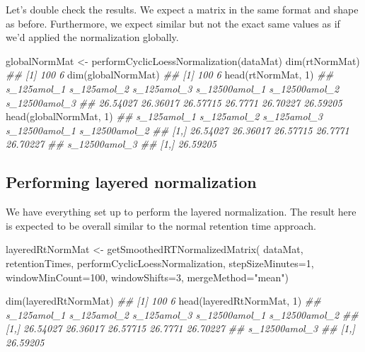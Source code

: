 \documentclass[]{article}
\newcommand{\hlnum}[1]{\textcolor[rgb]{0.816,0.125,0.439}{#1}}%
\newcommand{\hlstr}[1]{\textcolor[rgb]{0.251,0.627,0.251}{#1}}%
\newcommand{\hlcom}[1]{\textcolor[rgb]{0.502,0.502,0.502}{\textit{#1}}}%
\newcommand{\hlstd}[1]{\textcolor[rgb]{0.251,0.251,0.251}{#1}}%
\newenvironment{Shaded}{\begin{myshaded}}{\end{myshaded}}
\newcommand{\DecValTok}[1]{\hlnum{#1}}
\newcommand{\StringTok}[1]{\hlstr{#1}}
\newcommand{\DocumentationTok}[1]{\hlcom{#1}}
\newcommand{\OtherTok}[1]{{#1}}
\newcommand{\FunctionTok}[1]{\hlstd{#1}}
\newcommand{\AttributeTok}[1]{{#1}}
\newcommand{\NormalTok}[1]{\hlstd{#1}}
\begin{document}
Let's double check the results. We expect a matrix in the same format and shape as before. Furthermore, we expect similar but not the exact same values as if we'd applied the normalization globally.

\begin{Shaded}
\begin{Highlighting}[]
\NormalTok{globalNormMat }\OtherTok{\textless{}{-}} \FunctionTok{performCyclicLoessNormalization}\NormalTok{(dataMat)}
\FunctionTok{dim}\NormalTok{(rtNormMat)}
\DocumentationTok{\#\# [1] 100   6}
\FunctionTok{dim}\NormalTok{(globalNormMat)}
\DocumentationTok{\#\# [1] 100   6}
\FunctionTok{head}\NormalTok{(rtNormMat, }\DecValTok{1}\NormalTok{)}
\DocumentationTok{\#\#  s\_125amol\_1 s\_125amol\_2 s\_125amol\_3 s\_12500amol\_1 s\_12500amol\_2 s\_12500amol\_3}
\DocumentationTok{\#\#     26.54027    26.36017    26.57715       26.7771      26.70227      26.59205}
\FunctionTok{head}\NormalTok{(globalNormMat, }\DecValTok{1}\NormalTok{)}
\DocumentationTok{\#\#      s\_125amol\_1 s\_125amol\_2 s\_125amol\_3 s\_12500amol\_1 s\_12500amol\_2}
\DocumentationTok{\#\# [1,]    26.54027    26.36017    26.57715       26.7771      26.70227}
\DocumentationTok{\#\#      s\_12500amol\_3}
\DocumentationTok{\#\# [1,]      26.59205}
\end{Highlighting}
\end{Shaded}

\hypertarget{performing-layered-normalization}{%
\subsection{Performing layered normalization}\label{performing-layered-normalization}}

We have everything set up to perform the layered normalization. The result here is expected to be overall similar to the normal retention time approach.

\begin{Shaded}
\begin{Highlighting}[]
\NormalTok{layeredRtNormMat }\OtherTok{\textless{}{-}} \FunctionTok{getSmoothedRTNormalizedMatrix}\NormalTok{(}
\NormalTok{    dataMat, }
\NormalTok{    retentionTimes, }
\NormalTok{    performCyclicLoessNormalization, }
    \AttributeTok{stepSizeMinutes=}\DecValTok{1}\NormalTok{, }
    \AttributeTok{windowMinCount=}\DecValTok{100}\NormalTok{, }
    \AttributeTok{windowShifts=}\DecValTok{3}\NormalTok{, }
    \AttributeTok{mergeMethod=}\StringTok{"mean"}\NormalTok{)}

\FunctionTok{dim}\NormalTok{(layeredRtNormMat)}
\DocumentationTok{\#\# [1] 100   6}
\FunctionTok{head}\NormalTok{(layeredRtNormMat, }\DecValTok{1}\NormalTok{)}
\DocumentationTok{\#\#      s\_125amol\_1 s\_125amol\_2 s\_125amol\_3 s\_12500amol\_1 s\_12500amol\_2}
\DocumentationTok{\#\# [1,]    26.54027    26.36017    26.57715       26.7771      26.70227}
\DocumentationTok{\#\#      s\_12500amol\_3}
\DocumentationTok{\#\# [1,]      26.59205}
\end{Highlighting}
\end{Shaded}
\end{document}
